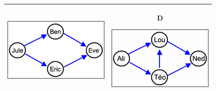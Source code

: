 \documentclass[12pt, a4paper]{article}
\begin{document}
\begin{minipage}{\textwidth}
\begin{table}[H]
\begin{tabulary}{\linewidth}{|C|C|}
					\includegraphics[width=0.9\linewidth]{option3}
					&
					\textbf{D} \vspace{0.2cm}
					
					\includegraphics[width=0.9\linewidth]{option4}
					\\ \hline 
				\end{tabulary}
			\end{table}
	\end{minipage} \\ \\
	
\end{document}
